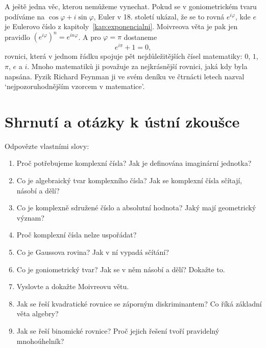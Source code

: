 A ještě jedna věc, kterou nemůžeme vynechat. Pokud se v goniometrickém tvaru podíváme na $\cos\varphi + i\sin\varphi$, Euler v 18. století ukázal, že se to rovná $e^{i\varphi}$, kde $e$ je Eulerovo číslo z kapitoly~\ref{kap:exponencialni}. Moivreova věta je pak jen pravidlo ${(e^{i\varphi})}^n = e^{in\varphi}$. A pro $\varphi = \pi$ dostaneme
\begin{equation*}
  e^{i\pi} + 1 = 0,
\end{equation*}
rovnici, která v jednom řádku spojuje pět nejdůležitějších čísel matematiky: $0$, $1$, $\pi$, $e$ a $i$. Mnoho matematiků ji považuje za nejkrásnější rovnici, jaká kdy byla napsána. Fyzik Richard Feynman ji ve svém deníku ve čtrnácti letech nazval `nejpozoruhodnějším vzorcem v matematice'.

\section{Shrnutí a otázky k ústní zkoušce}

\begin{problem}
  Odpovězte vlastními slovy:
  \begin{enumerate}
    \item Proč potřebujeme komplexní čísla? Jak je definována imaginární jednotka?
    \item Co je algebraický tvar komplexního čísla? Jak se komplexní čísla sčítají, násobí a dělí?
    \item Co je komplexně sdružené číslo a absolutní hodnota? Jaký mají geometrický význam?
    \item Proč komplexní čísla nelze uspořádat?
    \item Co je Gaussova rovina? Jak v ní vypadá sčítání?
    \item Co je goniometrický tvar? Jak se v něm násobí a dělí? Dokažte to.
    \item Vyslovte a dokažte Moivreovu větu.
    \item Jak se řeší kvadratické rovnice se záporným diskriminantem? Co říká základní věta algebry?
    \item Jak se řeší binomické rovnice? Proč jejich řešení tvoří pravidelný mnohoúhelník?
  \end{enumerate}
\end{problem}
